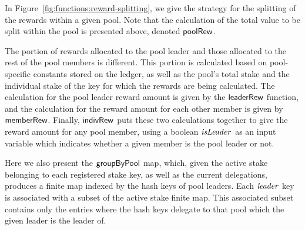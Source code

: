 In Figure~\ref{fig:functions:reward-splitting}, we give the strategy for the
splitting of the rewards within a given pool. Note that the calculation of
the total value to be split within the pool is presented above, denoted $\mathsf{poolRew}$.

The portion of rewards allocated to the pool leader and those allocated to
the rest of the pool members is different. This portion is calculated based
on pool-specific constants stored on the ledger, as well as
the pool's total stake and the individual stake of the key for which the rewards
are being calculated. The calculation for the pool
leader reward amount is given by the $\mathsf{leaderRew}$ function, and the
calculation for the reward amount for each other member is given by $\mathsf{memberRew}$.
Finally, $\mathsf{indivRew}$ puts these two calculations together to give the
reward amount for any pool member, using a boolean $\mathit{isLeader}$
as an input variable which indicates
whether a given member is the pool leader or not.

Here we also present the $\mathsf{groupByPool}$ map, which, given the active stake
belonging to each registered stake key,
as well as the current delegations, produces a
finite map indexed by the hash keys of pool leaders. Each $\mathit{leader}$ key is associated
with a subset of the active stake finite map. This associated subset
contains only the entries where the hash keys delegate to that pool
which the given leader is the leader of.

